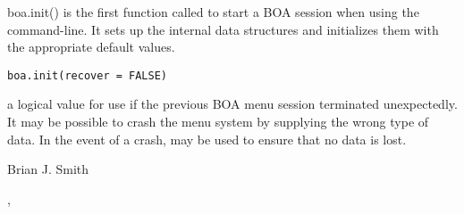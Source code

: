 \begin{Description}\relax
boa.init() is the first function called to start a BOA session when using the
command-line. It sets up the internal data structures and initializes them
with the appropriate default values.
\end{Description}
\begin{Usage}
\begin{verbatim}
boa.init(recover = FALSE)
\end{verbatim}
\end{Usage}
\begin{Arguments}
\begin{ldescription}
\item[\code{recover}] a logical value for use if the previous BOA menu session
terminated unexpectedly.  It may be possible to crash the menu system by
supplying the wrong type of data.  In the event of a crash, 
may be used to ensure that no data is lost.
\end{ldescription}
\end{Arguments}
\begin{Author}\relax
Brian J. Smith
\end{Author}
\begin{SeeAlso}\relax
{}, 
\end{SeeAlso}

